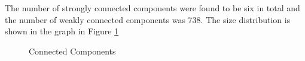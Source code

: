 The number of strongly connected components were found to be six in total and the number of weakly connected components was 738. The size distribution is shown in the graph in Figure \ref{fig:connected}

\begin{figure}[h!]
\centering
{}
\caption{Connected Components}
\label{fig:connected}
\end{figure}